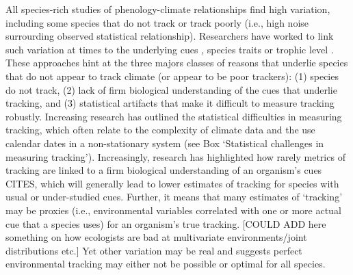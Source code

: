 \documentclass[11pt,letterpaper]{article}
\begin{document}
All species-rich studies of phenology-climate relationships find high variation, including some species that do not track or track poorly (i.e., high noise surrourding observed statistical relationship). Researchers have worked to link such variation at times to the underlying cues \citep[e.g.,][]{Cook:2012pnas}, species traits \citep[e.g.,][]{cohen2018} or trophic level \citep[e.g.,][]{thackeray2016}. These approaches hint at the three majors classes of reasons that underlie species that do not appear to track climate (or appear to be poor trackers): (1) species do not track, (2) lack of firm biological understanding of the cues that underlie tracking, and (3) statistical artifacts that make it difficult to measure tracking robustly. Increasing research has outlined the statistical difficulties in measuring tracking, which often relate to the complexity of climate data and the use calendar dates in a non-stationary system (see Box `Statistical challenges in measuring tracking'). Increasingly, research has highlighted how rarely metrics of tracking are linked to a firm biological understanding of an organism's cues CITES, which will generally lead to lower estimates of tracking for species with usual or under-studied cues. Further, it means that many estimates of `tracking' may be proxies (i.e., environmental variables correlated with one or more actual cue that a species uses) for an organism's true tracking. [COULD ADD here something on how ecologists are bad at multivariate environments/joint distributions etc.] Yet other variation may be real and suggests perfect environmental tracking may either not be possible or optimal for all species. 
\end{document}
